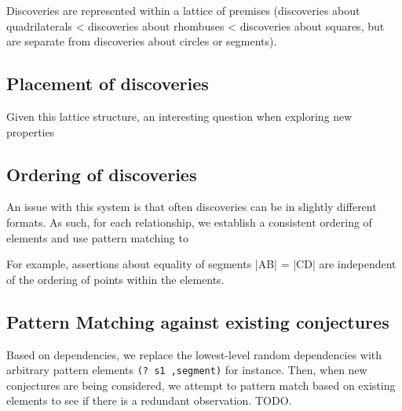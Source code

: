 Discoveries are represented within a lattice of premises (discoveries
about quadrilaterals < discoveries about rhombuses < discoveries about
squares, but are separate from discoveries about circles or segments).

\subsection{Placement of discoveries}

Given this lattice structure, an interesting question when exploring
new properties

\subsection{Ordering of discoveries}

An issue with this system is that often discoveries can be in slightly
different formats. As such, for each relationship, we establish a
consistent ordering of elements and use pattern matching to

For example, assertions about equality of segments |AB| = |CD| are
independent of the ordering of points within the elements.

\subsection{Pattern Matching against existing conjectures}

Based on dependencies, we replace the lowest-level random dependencies
with arbitrary pattern elements \texttt{(? s1 ,segment)} for
instance. Then, when new conjectures are being considered, we attempt
to pattern match based on existing elements to see if there is a
redundant observation. TODO.
